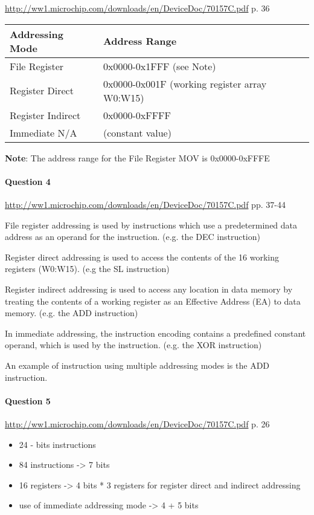 \documentclass[10pt]{article}
\begin{document}
\url{http://ww1.microchip.com/downloads/en/DeviceDoc/70157C.pdf} p. 36


\begin{tabular}{|l|l|}
\hline
{\bfseries Addressing Mode} & {\bfseries Address Range} \\
\hline\hline
File Register & 0x0000-0x1FFF (see Note)\\
\hline
Register Direct & 0x0000-0x001F (working register array W0:W15)\\
\hline
Register Indirect & 0x0000-0xFFFF \\
\hline
Immediate N/A & (constant value) \\
\hline
\end{tabular}

{\bfseries Note}: The address range for the File Register MOV is 0x0000-0xFFFE
	
\paragraph{Question 4}

\url{http://ww1.microchip.com/downloads/en/DeviceDoc/70157C.pdf} pp. 37-44

File register addressing is used by instructions which use a predetermined data address as an
operand for the instruction. (e.g. the DEC instruction)

Register direct addressing is used to access the contents of the 16 working registers (W0:W15). (e.g the SL instruction)

Register indirect addressing is used to access any location in data memory by treating the
contents of a working register as an Effective Address (EA) to data memory. (e.g. the ADD instruction)

In immediate addressing, the instruction encoding contains a predefined constant operand,
which is used by the instruction. (e.g. the XOR instruction)

An example of instruction using multiple addressing modes is the ADD instruction.


\paragraph{Question 5}

\url{http://ww1.microchip.com/downloads/en/DeviceDoc/70157C.pdf} p. 26

\begin{itemize}
\item 24 - bits instructions
\item 84 instructions -> 7 bits
\item 16 registers -> 4 bits  * 3 registers for register direct and indirect addressing
\item use of immediate addressing mode -> 4 + 5 bits
\end{itemize}
\end{document}
